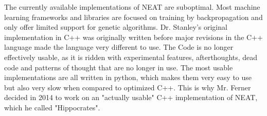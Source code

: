 The currently available implementations of NEAT are suboptimal.  
Most machine learning frameworks and libraries are focused on training by backpropagation and only offer limited support for genetic algorithms.  
Dr. Stanley's original implementation in C++ \cite{Stanley2011} was originally written before major revisions in the C++ language made the language very different to use. \cite{Stroustrup}  
The Code is no longer effectively usable, as it is ridden with experimental features, afterthoughts, dead code and patterns of thought that are no longer in use. 
The most usable implementations are all written in python, which makes them very easy to use but also very slow when compared to optimized C++.  
This is why Mr. Ferner decided in 2014 to work on an "actually usable" C++ implementation of NEAT, which he called "Hippocrates".